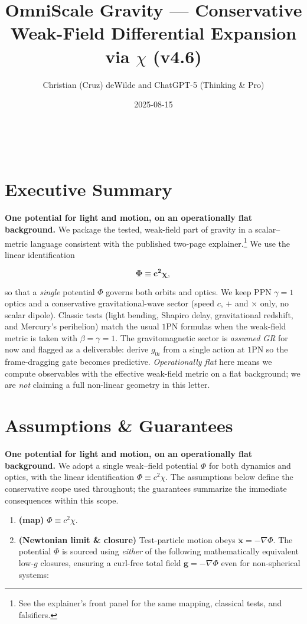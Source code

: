 \documentclass[
]{article}
\title{OmniScale Gravity --- Conservative Weak-Field Differential
Expansion via \(\chi\) (v4.6)}
\author{\protect\phantomsection\label{_Hlk206169066}{}Christian (Cruz)
deWilde and ChatGPT-5 (Thinking \& Pro)}
\date{2025-08-15}
\begin{document}
\maketitle

~

\section{Executive Summary}\label{executive-summary}

\textbf{One potential for light and motion, on an operationally flat
background.} We package the tested, weak-field part of gravity in a
scalar--metric language consistent with the published two-page
explainer.\footnote{See the explainer's front panel for the same
  mapping, classical tests, and falsifiers.} We use the linear
identification

\[\boxed{\mathbf{\Phi}\mathbf{\equiv}\mathbf{c}^{\mathbf{2}}\mathbf{\chi}},\]

so that a \emph{single} potential \(\Phi\) governs both orbits and
optics. We keep PPN \(\gamma = 1\) optics and a conservative
gravitational-wave sector (speed \(c\), \(+\) and \(\times\) only, no
scalar dipole). Classic tests (light bending, Shapiro delay,
gravitational redshift, and Mercury's perihelion) match the usual
\(1\)PN formulas when the weak-field metric is taken with
\(\beta = \gamma = 1\). The gravitomagnetic sector is \emph{assumed GR}
for now and flagged as a deliverable: derive \(g_{0i}\) from a single
action at \(1\)PN so the frame-dragging gate becomes predictive.
\emph{Operationally flat} here means we compute observables with the
effective weak-field metric on a flat background; we are \emph{not}
claiming a full non-linear geometry in this letter.

\section{Assumptions \& Guarantees}\label{assumptions-guarantees}

\textbf{One potential for light and motion, on an operationally flat
background.} We adopt a single weak--field potential \(\Phi\) for both
dynamics and optics, with the linear identification
\(\Phi \equiv c^{2}\chi\). The assumptions below define the conservative
scope used throughout; the guarantees summarize the immediate
consequences within this scope.

\begin{enumerate}
\def\labelenumi{\arabic{enumi}.}
\item
  \textbf{(map)} \(\Phi \equiv c^{2}\chi\).
\item
  \textbf{(Newtonian limit \& closure)} Test-particle motion obeys
  \(\ddot{\mathbf{x}} = - \nabla\Phi\). The potential \(\Phi\) is
  sourced using \emph{either} of the following mathematically equivalent
  low-\(g\) closures, ensuring a curl-free total field
  \(\mathbf{g} = - \nabla\Phi\) even for non-spherical systems:
\end{enumerate}
\end{document}
